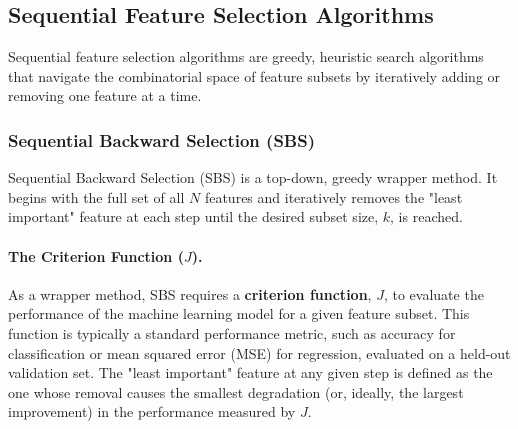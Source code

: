 \subsection{Sequential Feature Selection Algorithms}
Sequential feature selection algorithms are greedy, heuristic search algorithms that navigate the combinatorial space of feature subsets by iteratively adding or removing one feature at a time.

\subsubsection{Sequential Backward Selection (SBS)}
Sequential Backward Selection (SBS) is a top-down, greedy wrapper method. It begins with the full set of all $N$ features and iteratively removes the "least important" feature at each step until the desired subset size, $k$, is reached.

\paragraph{The Criterion Function ($J$).} As a wrapper method, SBS requires a \textbf{criterion function}, $J$, to evaluate the performance of the machine learning model for a given feature subset. This function is typically a standard performance metric, such as accuracy for classification or mean squared error (MSE) for regression, evaluated on a held-out validation set. The "least important" feature at any given step is defined as the one whose removal causes the smallest degradation (or, ideally, the largest improvement) in the performance measured by $J$.

